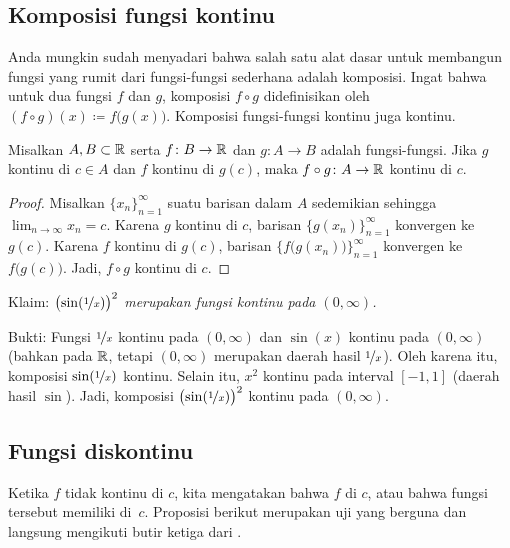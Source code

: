 \subsection{Komposisi fungsi kontinu}

Anda mungkin sudah menyadari bahwa salah satu alat dasar untuk
membangun fungsi yang rumit dari fungsi-fungsi sederhana adalah komposisi.
Ingat bahwa untuk dua fungsi $f$ dan $g$,
komposisi $f \circ g$ didefinisikan oleh
$(f \circ g)(x) \coloneqq f\bigl(g(x)\bigr)$.
Komposisi
fungsi-fungsi kontinu juga
kontinu.

\begin{prop} \label{prop:compositioncont}
Misalkan $A, B \subset {\mathbb{R}}$ serta $f \colon B \to {\mathbb{R}}$ dan $g \colon A \to B$ adalah
fungsi-fungsi.  Jika $g$ kontinu di $c \in A$ dan
$f$ kontinu di $g(c)$, maka $f \circ g \colon A \to {\mathbb{R}}$ kontinu
di $c$.
\end{prop}

\begin{proof}
Misalkan $\{ x_n \}_{n=1}^\infty$ suatu barisan dalam $A$ sedemikian sehingga
$\lim_{n\to\infty} x_n = c$.
Karena $g$ kontinu di $c$, barisan $\bigl\{ g(x_n) \bigr\}_{n=1}^\infty$ konvergen ke $g(c)$.
Karena $f$ kontinu di $g(c)$, barisan $\bigl\{ f\bigl(g(x_n)\bigr)
\bigr\}_{n=1}^\infty$ konvergen
ke $f\bigl(g(c)\bigr)$.
Jadi, $f \circ g$ kontinu di $c$.
\end{proof}

\begin{example}
Klaim: \emph{${\bigl(\sin(\nicefrac{1}{x})\bigr)}^2$ merupakan fungsi
kontinu pada $(0,\infty)$.}

Bukti: Fungsi $\nicefrac{1}{x}$ kontinu pada
$(0,\infty)$ dan $\sin(x)$ kontinu pada $(0,\infty)$ (bahkan
pada ${\mathbb{R}}$, tetapi $(0,\infty)$ merupakan daerah hasil $\nicefrac{1}{x}$).
Oleh karena itu, komposisi $\sin(\nicefrac{1}{x})$ kontinu.  Selain itu,
$x^2$ kontinu pada interval $[-1,1]$ (daerah hasil $\sin$).
Jadi, komposisi
${\bigl(\sin(\nicefrac{1}{x})\bigr)}^2$ kontinu pada $(0,\infty)$.
\end{example}

\subsection{Fungsi diskontinu}

Ketika $f$ tidak kontinu di $c$, kita
mengatakan bahwa $f$ \emph{} di $c$, atau bahwa fungsi tersebut memiliki
\emph{} di~$c$.
Proposisi berikut merupakan uji yang berguna dan langsung mengikuti
butir ketiga dari .

